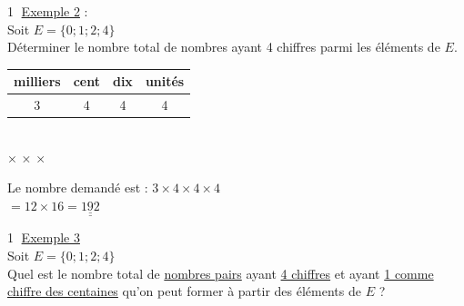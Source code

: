 \documentclass[12pt,a4paper]{article}
\begin{document}
\vspace{1em}
\noindent \textcircled{1} \underline{Exemple 2} : \\
Soit $E = \{0; 1; 2; 4\}$ \\
Déterminer le nombre total de nombres ayant 4 chiffres parmi les éléments de $E$.

\vspace{1.5em}

\begin{center}
\renewcommand{\arraystretch}{2} %
\begin{tabular}{|c|c|c|c|}
    \hline
    milliers & cent & dix & unités \\
    \hline
    {\color{green!60!black}\Huge 3} & {\color{green!60!black}\Huge 4} & {\color{green!60!black}\Huge 4} & {\color{green!60!black}\Huge 4} \\
    \hline
\end{tabular}
\\[-0.5ex] %
\hspace{0.2cm} {\color{red}\Large $\times$} \hspace{1.3cm} {\color{red}\Large $\times$} \hspace{1.3cm} {\color{red}\Large $\times$}
\end{center}

\vspace{1em}

\noindent Le nombre demandé est : $3 \times 4 \times 4 \times 4$ \\
\hspace*{4.5cm} $= 12 \times 16 = \underline{\underline{192}}$

\vspace{1.5em}

\noindent \textcircled{1} \underline{Exemple 3} \\
\hspace*{2cm} Soit $E = \{0; 1; 2; 4\}$ \\
Quel est le nombre total de \color{red}\underline{\color{black}nombres pairs} \color{black} ayant \color{red}\underline{\color{black}4 chiffres} \color{black} et ayant \color{red}\underline{\color{black}1 comme} \color{red}\underline{\color{black}chiffre des centaines} \color{black} qu'on peut former à partir des éléments de $E$ ?

\vspace{1.5em}
\end{document}
